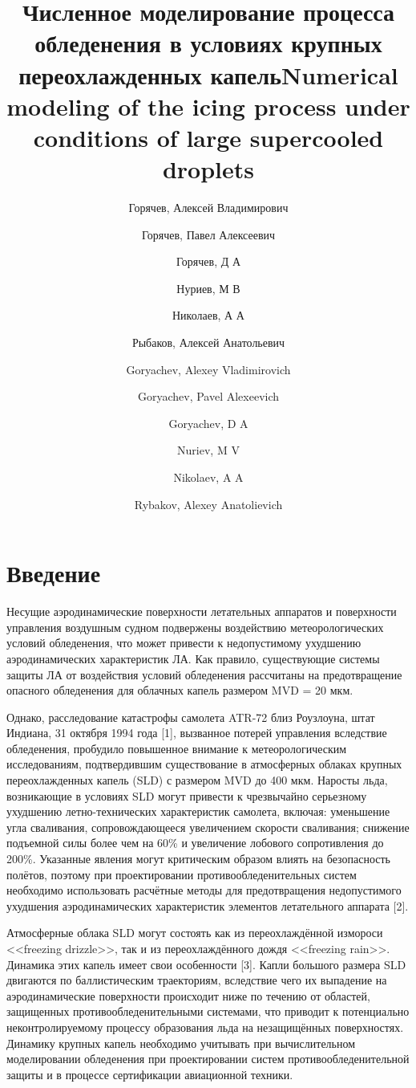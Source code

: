 \documentclass{psta}%
\title [Шаблон стилевого файла]{Численное моделирование процесса обледенения в условиях крупных переохлажденных капель}
\author{Горячев, Алексей Владимирович}
\author{Горячев, Павел Алексеевич}
\author{Горячев, Д А}
\author{Нуриев, М В}
\author{Николаев, А А}
\author{Рыбаков, Алексей Анатольевич}
\title[Template for submission]{Numerical modeling of the icing process under conditions of large supercooled droplets}
\author{Goryachev, Alexey Vladimirovich}
\author{Goryachev, Pavel Alexeevich}
\author{Goryachev, D A}
\author{Nuriev, M V}
\author{Nikolaev, A A}
\author{Rybakov, Alexey Anatolievich}
\begin{document}
\Russian
\maketitle

\section*{Введение}

Несущие аэродинамические поверхности летательных аппаратов и поверхности управления воздушным судном подвержены воздействию метеорологических условий обледенения, что может привести к недопустимому ухудшению аэродинамических характеристик ЛА.
Как правило, существующие системы защиты ЛА от воздействия условий обледенения рассчитаны на предотвращение опасного обледенения для облачных капель размером MVD = 20 мкм.

Однако, расследование катастрофы самолета ATR-72 близ Роузлоуна, штат Индиана, 31 октября 1994 года [1], вызванное потерей управления вследствие обледенения, пробудило повышенное внимание к метеорологическим исследованиям, подтвердившим существование в атмосферных облаках крупных переохлажденных капель (SLD) с размером MVD до 400 мкм.
Наросты льда, возникающие в условиях SLD могут привести к чрезвычайно серьезному ухудшению летно-технических характеристик самолета, включая: уменьшение угла сваливания, сопровождающееся увеличением скорости сваливания; снижение подъемной силы более чем на 60\% и увеличение лобового сопротивления до 200\%.
Указанные явления могут критическим образом влиять на безопасность полётов, поэтому при проектировании противообледенительных систем необходимо использовать расчётные методы для предотвращения недопустимого ухудшения аэродинамических характеристик элементов летательного аппарата [2].

Атмосферные облака SLD могут состоять как из переохлаждённой измороси <<freezing drizzle>>, так и из переохлаждённого дождя <<freezing rain>>.
Динамика этих капель имеет свои особенности [3].
Капли большого размера SLD двигаются по баллистическим траекториям, вследствие чего их выпадение на аэродинамические поверхности происходит ниже по течению от областей, защищенных противообледенительными системами, что приводит к потенциально неконтролируемому процессу образования льда на незащищённых поверхностях. Динамику крупных капель необходимо учитывать при вычислительном моделировании обледенения при проектировании систем противообледенительной защиты и в процессе сертификации авиационной техники.
\end{document}
